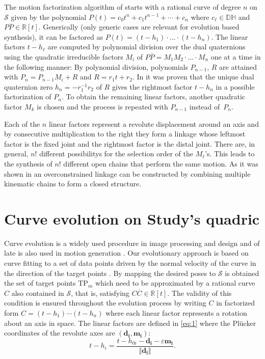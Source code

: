 \documentclass{scrartcl}
\renewcommand{\vec}[1]{\mathbf{#1}}
\newcommand{\TP}{\text{TP}}
\newcommand{\eps}{\varepsilon}
\newcommand{\R}{\mathbb{R}}
\newcommand{\cj}[1]{\overline{#1}}
\newcommand{\quadric}[1]{\mathcal{#1}}
\newcommand{\SQ}{\quadric{S}}
\begin{document}
The motion factorization algorithm of \cite{journal factorization RJ} starts
with a rational curve of degree $n$ on $\SQ$ given by the polynomial
$P(t)=c_0t^n+c_1t^{n-1}+ \cdots+c_n $ where $c_\ell \in \mathbb{DH}$ and
$P\cj{P} \in \R[t]$. Generically (only generic cases are relevant for evolution
based synthesis), it can be factored as $P(t)=(t-h_1) \cdot \ldots \cdot
(t-h_n)$. The linear factors $t-h_\ell$ are computed by polynomial division over
the dual quaternions using the quadratic irreducible factors $M_i$ of
$P\cj{P}=M_1M_2 \cdot \ldots \cdot M_n$ one at a time in the following manner:
By polynomial division, polynomials $P_{n-1}$, $R$ are attained with $P_n=P_{n-1}M_i+R$
and $R = r_1t+r_2$. In \cite{journal factorization RJ} it was proven that the
unique dual quaternion zero $h_n = -r_1^{-1}r_2$ of $R$ gives the rightmost
factor $t-h_n$ in a possible factorization of $P_n$. To obtain the remaining
linear factors, another quadratic factor $M_k$ is chosen and the process is
repeated with $P_{n-1}$ instead of~$P_n$.

Each of the $n$ linear factors represent a revolute displacement around an axis and by consecutive multiplication to the right they form a linkage whose leftmost factor is the fixed joint and the rightmost factor is the distal joint. There are, in general, $n!$ different possibilitys for the selection order of the $M_\ell$'s. This leads to the synthesis of $n!$ different open chains that perform the same motion. As it was shown in \cite{journal factorization RJ} an overconstrained linkage can be constructed by combining multiple kinematic chains to form a closed structure.


\section{Curve evolution on Study's quadric}
\label{sec:evolution}

Curve evolution is a widely used procedure in image processing and design and of
late is also used in motion generation \cite{journal OB metric}. Our
evolutionary approach is based on curve fitting to a set of data points driven
by the normal velocity of the curve in the direction of the target points
\cite{Curve Evolution}. By mapping the desired poses to $\SQ$ is obtained the set of
target points $\TP_m$ which need to be approximated by a rational curve $C$ also
contained in $\SQ$, that is, satisfying $C\cj{C} \in \R[t]$. The
validity of this condition is ensured throughout the evolution process by writing $C$ in
factorized form $C = (t-h_1) \cdots (t-h_n)$ where each linear factor represents
a rotation about an axis in space. The linear factors are defined in
\eqref{eq:1} where the Plücker coordinates of the revolute axes are $(\vec{d_i} , \vec{m_i})$:
\begin{equation}
  \label{eq:1}
  t-h_i = \frac{t-h_{0i} - \vec{d_i} - \eps\vec{m_i}}{\Vert \vec{d_i} \Vert}.
\end{equation}
\end{document}
